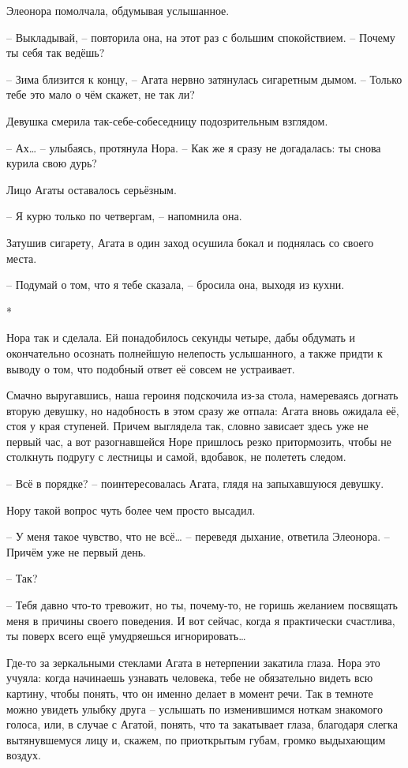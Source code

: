 \documentclass[
  a5paperpaper,
  DIV=11,
  numbers=noendperiod]{scrreprt}
\begin{document}
Элеонора помолчала, обдумывая услышанное.

-- Выкладывай, -- повторила она, на этот раз с большим спокойствием. --
Почему ты себя так ведёшь?

-- Зима близится к концу, -- Агата нервно затянулась сигаретным дымом.
-- Только тебе это мало о чём скажет, не так ли?

Девушка смерила так-себе-собеседницу подозрительным взглядом.

-- Ах\ldots{} -- улыбаясь, протянула Нора. -- Как же я сразу не
догадалась: ты снова курила свою дурь?

Лицо Агаты оставалось серьёзным.

-- Я курю только по четвергам, -- напомнила она.

Затушив сигарету, Агата в один заход осушила бокал и поднялась со своего
места.

-- Подумай о том, что я тебе сказала, -- бросила она, выходя из кухни.

*

Нора так и сделала. Ей понадобилось секунды четыре, дабы обдумать и
окончательно осознать полнейшую нелепость услышанного, а также придти к
выводу о том, что подобный ответ её совсем не устраивает.

Смачно выругавшись, наша героиня подскочила из-за стола, намереваясь
догнать вторую девушку, но надобность в этом сразу же отпала: Агата
вновь ожидала её, стоя у края ступеней. Причем выглядела так, словно
зависает здесь уже не первый час, а вот разогнавшейся Норе пришлось
резко притормозить, чтобы не столкнуть подругу с лестницы и самой,
вдобавок, не полететь следом.

-- Всё в порядке? -- поинтересовалась Агата, глядя на запыхавшуюся
девушку.

Нору такой вопрос чуть более чем просто высадил.

-- У меня такое чувство, что не всё\ldots{} -- переведя дыхание,
ответила Элеонора. -- Причём уже не первый день.

-- Так?

-- Тебя давно что-то тревожит, но ты, почему-то, не горишь желанием
посвящать меня в причины своего поведения. И вот сейчас, когда я
практически счастлива, ты поверх всего ещё умудряешься
игнорировать\ldots{}

Где-то за зеркальными стеклами Агата в нетерпении закатила глаза. Нора
это учуяла: когда начинаешь узнавать человека, тебе не обязательно
видеть всю картину, чтобы понять, что он именно делает в момент речи.
Так в темноте можно увидеть улыбку друга -- услышать по изменившимся
ноткам знакомого голоса, или, в случае с Агатой, понять, что та
закатывает глаза, благодаря слегка вытянувшемуся лицу и, скажем, по
приоткрытым губам, громко выдыхающим воздух.
\end{document}
